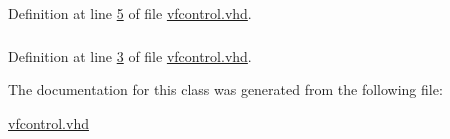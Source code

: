 Definition at line \hyperlink{vfcontrol_8vhd_source_l00005}{5} of file \hyperlink{vfcontrol_8vhd_source}{vfcontrol.\+vhd}.

\hypertarget{classvfcontrol_a241c3e72dd8024cc8ae831b1b2aed7db}{}
\subsubsection[{S\+T\+D\+\_\+\+L\+O\+G\+I\+C\+\_\+\+U\+N\+S\+I\+G\+N\+E\+D}]{\hspace{0.3cm}{\ttfamily [Package]}}\label{classvfcontrol_a241c3e72dd8024cc8ae831b1b2aed7db}


Definition at line \hyperlink{vfcontrol_8vhd_source_l00003}{3} of file \hyperlink{vfcontrol_8vhd_source}{vfcontrol.\+vhd}.



The documentation for this class was generated from the following file\+:\begin{DoxyCompactItemize}
\item 
\hyperlink{vfcontrol_8vhd}{vfcontrol.\+vhd}\end{DoxyCompactItemize}
